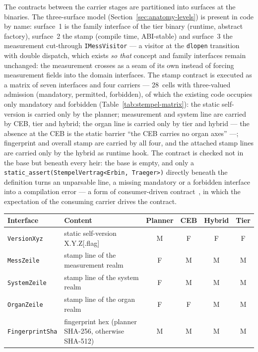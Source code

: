 \begin{nurlang}
The contracts between the carrier stages are partitioned into surfaces at the binaries. The
three-surface model (Section~\ref{sec:anatomy-levels}) is present in code by name: surface~1 is the
family interface of the tier binary (runtime, abstract factory), surface~2 the stamp (compile time,
ABI-stable) and surface~3 the measurement cut-through \texttt{IMessVisitor} --- a visitor at the
\texttt{dlopen} transition with double dispatch, which exists \emph{so that} concept and family interfaces
remain unchanged: the measurement crosses as a seam of its own instead of forcing measurement fields
into the domain interfaces. The stamp contract is executed as a matrix of seven interfaces and four
carriers --- 28~cells with three-valued admission (mandatory, permitted, forbidden), of which the existing
code occupies only mandatory and forbidden (Table~\ref{tab:stempel-matrix}): the static self-version is
carried only by the planner; measurement and system line are carried by CEB, tier and hybrid; the organ
line is carried only by tier and hybrid --- the absence at the CEB is the static barrier \enquote{the CEB
carries no organ axes} ---; fingerprint and overall stamp are carried by all four, and the attached
stamp lines are carried only by the hybrid as runtime hook. The contract is checked not in the base but
beneath every heir: the base is empty, and only a
\texttt{static\_assert(StempelVertrag<Erbin, Traeger>)} directly beneath the definition turns an
unparsable line, a missing mandatory or a forbidden interface into a compilation error --- a form of
consumer-driven contract~\cite{robinson2006cdc}, in which the expectation of the consuming carrier
drives the contract.
\begin{table}[htbp]\centering\footnotesize
\begin{tabular}{@{}llcccc@{}}
\toprule
Interface & Content & Planner & CEB & Hybrid & Tier \\
\midrule
\texttt{VersionXyz}     & static self-version X.Y.Z[.flag]                  & M & F & F & F \\
\texttt{MessZeile}      & stamp line of the measurement realm               & F & M & M & M \\
\texttt{SystemZeile}    & stamp line of the system realm                    & F & M & M & M \\
\texttt{OrganZeile}     & stamp line of the organ realm                     & F & F & M & M \\
\texttt{FingerprintSha} & fingerprint hex (planner SHA-256, otherwise SHA-512) & M & M & M & M \\

\end{tabular}
\end{table}
\end{nurlang}
